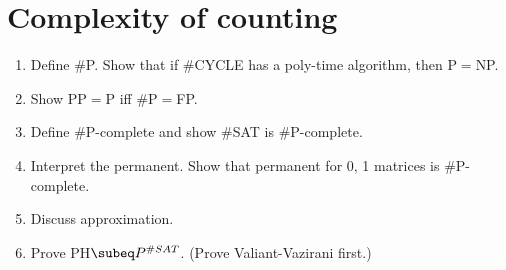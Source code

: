 \section{Complexity of counting}
\begin{enumerate}
\item
Define \#P. Show that if \#CYCLE has a poly-time algorithm, then P$=$NP.
\item Show PP$=$P iff \#P$=$FP.
\item Define \#P-complete and show \#SAT is \#P-complete.
\item Interpret the permanent. Show that permanent for 0, 1 matrices is \#P-complete.
\item Discuss approximation.
\item Prove PH$\subeq P^{\#SAT}$. (Prove Valiant-Vazirani first.)
\end{enumerate}
